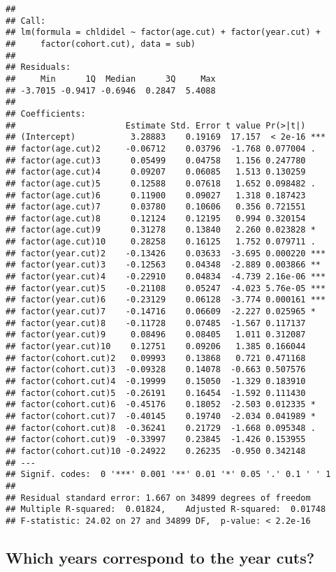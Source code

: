 \documentclass[]{article}
\begin{document}
\begin{verbatim}
## 
## Call:
## lm(formula = chldidel ~ factor(age.cut) + factor(year.cut) + 
##     factor(cohort.cut), data = sub)
## 
## Residuals:
##     Min      1Q  Median      3Q     Max 
## -3.7015 -0.9417 -0.6946  0.2847  5.4088 
## 
## Coefficients:
##                      Estimate Std. Error t value Pr(>|t|)    
## (Intercept)           3.28883    0.19169  17.157  < 2e-16 ***
## factor(age.cut)2     -0.06712    0.03796  -1.768 0.077004 .  
## factor(age.cut)3      0.05499    0.04758   1.156 0.247780    
## factor(age.cut)4      0.09207    0.06085   1.513 0.130259    
## factor(age.cut)5      0.12588    0.07618   1.652 0.098482 .  
## factor(age.cut)6      0.11900    0.09027   1.318 0.187423    
## factor(age.cut)7      0.03780    0.10606   0.356 0.721551    
## factor(age.cut)8      0.12124    0.12195   0.994 0.320154    
## factor(age.cut)9      0.31278    0.13840   2.260 0.023828 *  
## factor(age.cut)10     0.28258    0.16125   1.752 0.079711 .  
## factor(year.cut)2    -0.13426    0.03633  -3.695 0.000220 ***
## factor(year.cut)3    -0.12563    0.04348  -2.889 0.003866 ** 
## factor(year.cut)4    -0.22910    0.04834  -4.739 2.16e-06 ***
## factor(year.cut)5    -0.21108    0.05247  -4.023 5.76e-05 ***
## factor(year.cut)6    -0.23129    0.06128  -3.774 0.000161 ***
## factor(year.cut)7    -0.14716    0.06609  -2.227 0.025965 *  
## factor(year.cut)8    -0.11728    0.07485  -1.567 0.117137    
## factor(year.cut)9     0.08496    0.08405   1.011 0.312087    
## factor(year.cut)10    0.12751    0.09206   1.385 0.166044    
## factor(cohort.cut)2   0.09993    0.13868   0.721 0.471168    
## factor(cohort.cut)3  -0.09328    0.14078  -0.663 0.507576    
## factor(cohort.cut)4  -0.19999    0.15050  -1.329 0.183910    
## factor(cohort.cut)5  -0.26191    0.16454  -1.592 0.111430    
## factor(cohort.cut)6  -0.45176    0.18052  -2.503 0.012335 *  
## factor(cohort.cut)7  -0.40145    0.19740  -2.034 0.041989 *  
## factor(cohort.cut)8  -0.36241    0.21729  -1.668 0.095348 .  
## factor(cohort.cut)9  -0.33997    0.23845  -1.426 0.153955    
## factor(cohort.cut)10 -0.24922    0.26235  -0.950 0.342148    
## ---
## Signif. codes:  0 '***' 0.001 '**' 0.01 '*' 0.05 '.' 0.1 ' ' 1
## 
## Residual standard error: 1.667 on 34899 degrees of freedom
## Multiple R-squared:  0.01824,    Adjusted R-squared:  0.01748 
## F-statistic: 24.02 on 27 and 34899 DF,  p-value: < 2.2e-16
\end{verbatim}

\hypertarget{which-years-correspond-to-the-year-cuts}{%
\subsection{Which years correspond to the year
cuts?}\label{which-years-correspond-to-the-year-cuts}}
\end{document}
